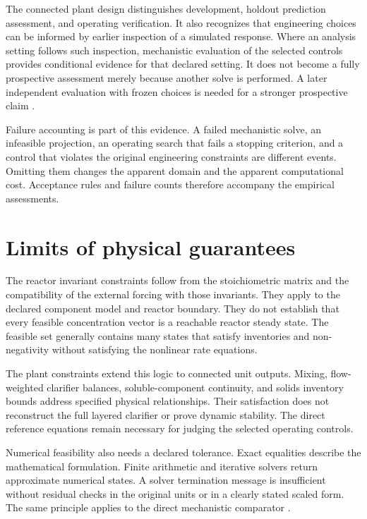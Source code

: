 The connected plant design distinguishes development, holdout prediction assessment, and operating verification. It also recognizes that engineering choices can be informed by earlier inspection of a simulated response. Where an analysis setting follows such inspection, mechanistic evaluation of the selected controls provides conditional evidence for that declared setting. It does not become a fully prospective assessment merely because another solve is performed. A later independent evaluation with frozen choices is needed for a stronger prospective claim \citep{Kaufman2012,Zhang2026}.

Failure accounting is part of this evidence. A failed mechanistic solve, an infeasible projection, an operating search that fails a stopping criterion, and a control that violates the original engineering constraints are different events. Omitting them changes the apparent domain and the apparent computational cost. Acceptance rules and failure counts therefore accompany the empirical assessments.

\section{Limits of physical guarantees}

The reactor invariant constraints follow from the stoichiometric matrix and the compatibility of the external forcing with those invariants. They apply to the declared component model and reactor boundary. They do not establish that every feasible concentration vector is a reachable reactor steady state. The feasible set generally contains many states that satisfy inventories and non-negativity without satisfying the nonlinear rate equations.

The plant constraints extend this logic to connected unit outputs. Mixing, flow-weighted clarifier balances, soluble-component continuity, and solids inventory bounds address specified physical relationships. Their satisfaction does not reconstruct the full layered clarifier or prove dynamic stability. The direct reference equations remain necessary for judging the selected operating controls.

Numerical feasibility also needs a declared tolerance. Exact equalities describe the mathematical formulation. Finite arithmetic and iterative solvers return approximate numerical states. A solver termination message is insufficient without residual checks in the original units or in a clearly stated scaled form. The same principle applies to the direct mechanistic comparator \citep{Boyd2004,BuzziFerraris2013}.


